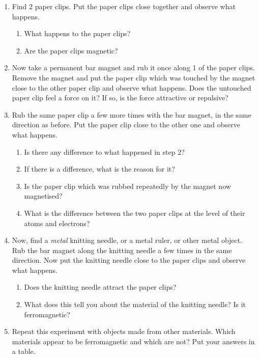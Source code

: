       \label{m37830*id128416}\begin{enumerate}[noitemsep, label=\textbf{\arabic*}. ] 
            \label{m37830*uid1}\item Find 2 paper clips. Put the paper clips close together and observe what happens.
\label{m37830*id128431}\begin{enumerate}[noitemsep, label=\textbf{\alph*}. ] 
            \label{m37830*uid2}\item What happens to the paper clips?\label{m37830*uid3}\item Are the paper clips magnetic?\end{enumerate}
        \label{m37830*uid4}\item Now take a permanent bar magnet and rub it once along 1 of the paper clips. Remove the magnet and put the paper clip which was touched by the magnet close to the other paper clip and observe what happens. Does the untouched paper clip feel a force on it? If so, is the force attractive or repulsive?\label{m37830*uid6}\item Rub the same paper clip a few more times with the bar magnet, in the same direction as before. Put the paper clip close to the other one and observe what happens.
\label{m37830*id128510}\begin{enumerate}[noitemsep, label=\textbf{\alph*}. ] 
            \label{m37830*uid7}\item Is there any difference to what happened in step 2?\label{m37830*uid8}\item If there is a difference, what is the reason for it?\label{m37830*uid9}\item Is the paper clip which was rubbed repeatedly by the magnet now magnetised?\label{m37830*uid10}\item What is the difference between the two paper clips at the level of their atoms and electrons?\end{enumerate}
        \label{m37830*uid11}\item Now, find a \textsl{metal} knitting needle, or a metal ruler, or other metal object. Rub the bar magnet along the knitting needle a few times in the same direction. Now put the knitting needle close to the paper clips and observe what happens.
\label{m37830*id128593}\begin{enumerate}[noitemsep, label=\textbf{\alph*}. ] 
            \label{m37830*uid12}\item Does the knitting needle attract the paper clips?\label{m37830*uid13}\item What does this tell you about the material of the knitting needle? Is it ferromagnetic?\end{enumerate}
        \label{m37830*uid14}\item Repeat this experiment with objects made from other materials. Which materials appear to be ferromagnetic and which are not? Put your answers in a table.\end{enumerate}
        
